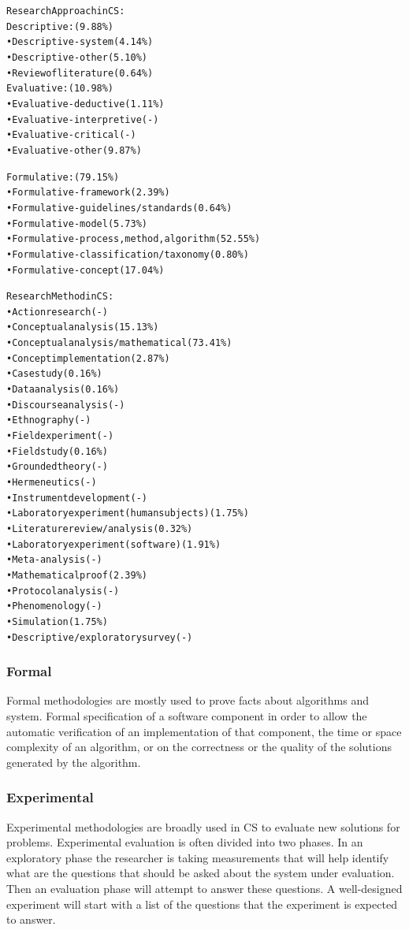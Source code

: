 \begin{alltt}
  Research Approach in CS:
  Descriptive: (9.88\%)
  •	Descriptive-system (4.14\%)
  •	Descriptive-other (5.10\%)
  •	Review of literature (0.64\%)
  Evaluative: (10.98\%)
  •	Evaluative-deductive (1.11\%)
  •	Evaluative-interpretive (-)
  •	Evaluative-critical (-)
  •	Evaluative-other (9.87\%)

  Formulative: (79.15\%)
  •	Formulative-framework (2.39\%)
  •	Formulative-guidelines/standards (0.64\%)
  •	Formulative-model (5.73\%)
  •	Formulative-process, method, algorithm (52.55\%)
  •	Formulative-classification/taxonomy (0.80\%)
  •	Formulative-concept (17.04\%)

   Research Method in CS:
  •	Action research (-)
  •	Conceptual analysis (15.13\%)
  •	Conceptual analysis/mathematical (73.41\%)
  •	Concept implementation (2.87\%)
  •	Case study (0.16\%)
  •	Data analysis (0.16\%)
  •	Discourse analysis (-)
  •	Ethnography (-)
  •	Field experiment (-)
  •	Field study (0.16\%)
  •	Grounded theory (-)
  •	Hermeneutics (-)
  •	Instrument development (-)
  •	Laboratory experiment (human subjects) (1.75\%)
  •	Literature review / analysis (0.32\%)
  •	Laboratory experiment (software) (1.91\%)
  •	Meta-analysis (-)
  •	Mathematical proof (2.39\%)
  •	Protocol analysis (-)
  •	Phenomenology (-)
  •	Simulation (1.75\%)
  •	Descriptive/exploratory survey (-)
\end{alltt}
\autocite{Ramesh2004}

\subsubsection*{Formal}

Formal methodologies are mostly used to prove facts about algorithms and system. Formal specification of a software component in order to allow the automatic verification of an implementation of that component, the time or space complexity of an algorithm, or on the correctness or the quality of the solutions generated by the algorithm. \autocite{Amaral}

\subsubsection*{Experimental}

Experimental methodologies are broadly used in CS to evaluate new solutions for problems. Experimental evaluation is often divided into two phases. In an exploratory phase the researcher is taking measurements that will help identify what are the questions that should be asked about the system under evaluation. Then an evaluation phase will attempt to answer these questions. A well-designed experiment will start with a list of the questions that the experiment is expected to answer. \autocite{Amaral}

